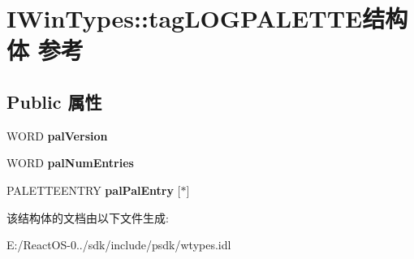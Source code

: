 \hypertarget{struct_i_win_types_1_1tag_l_o_g_p_a_l_e_t_t_e}{}\section{I\+Win\+Types\+:\+:tag\+L\+O\+G\+P\+A\+L\+E\+T\+T\+E结构体 参考}
\label{struct_i_win_types_1_1tag_l_o_g_p_a_l_e_t_t_e}
\subsection*{Public 属性}
\begin{DoxyCompactItemize}
\item 
\mbox{\label{struct_i_win_types_1_1tag_l_o_g_p_a_l_e_t_t_e_acaa5901f6b790bc74c871a61c8a9d3fa}} 
W\+O\+RD {\bfseries pal\+Version}
\item 
\mbox{\label{struct_i_win_types_1_1tag_l_o_g_p_a_l_e_t_t_e_a38303249ed412aa68b9d4723f6fbb7f0}} 
W\+O\+RD {\bfseries pal\+Num\+Entries}
\item 
\mbox{\label{struct_i_win_types_1_1tag_l_o_g_p_a_l_e_t_t_e_a371cb43c818aafdfbbc4d4ad3988650f}} 
P\+A\+L\+E\+T\+T\+E\+E\+N\+T\+RY {\bfseries pal\+Pal\+Entry} \mbox{[}$\ast$\mbox{]}
\end{DoxyCompactItemize}


该结构体的文档由以下文件生成\+:\begin{DoxyCompactItemize}
\item 
E\+:/\+React\+O\+S-\/0../sdk/include/psdk/wtypes.\+idl\end{DoxyCompactItemize}
